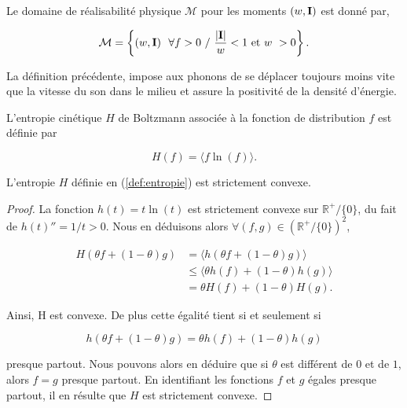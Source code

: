 \begin{definition}

  Le domaine de réalisabilité physique $\mathcal{M}$ pour les moments $(w,\mathbf{I})$ 
  est donné par,

  \begin{equation}
    \mathcal{M} = \left\{ (w,\mathbf{I})\ \ \forall f > 0 \ / \ \frac{\left\lvert \mathbf{I} \right\rvert}{w } 
    < 1 \mbox{ et } w \ > 0 \right\}.
  \end{equation}

\end{definition}

La définition précédente, impose aux phonons de se déplacer toujours moins vite que la vitesse du son dans le milieu et assure la positivité de la densité d'énergie.

\begin{definition}

  L'entropie cinétique $H$ de Boltzmann associée à la fonction de distribution 
  $f$ est définie par

  \begin{equation}
  \label{def:entropie}
    H(f) = \langle f \ln(f) \rangle.
  \end{equation}
 
\end{definition}

\begin{proposition}
L'entropie $H$ définie en (\ref{def:entropie}) est strictement convexe.
\end{proposition}

\begin{proof}
La fonction $h(t) = t\ln(t)$ est strictement convexe sur 
$\mathbb{R}^{+}/ \{0\}$, du fait de $h(t)'' = 1/t > 0$. Nous en déduisons alors
 $\forall (f,g) \in (\mathbb{R}^{+}/ \{0\})^2$, 
  
  \begin{equation}
  \begin{aligned}
  H(\theta f + (1-\theta)g) &= \langle h(\theta f + (1-\theta)g) \rangle\\
  & \leq  \langle \theta h(f) + (1-\theta)h(g) \rangle\\
  & = \theta H(f) + (1-\theta)H(g).
  \end{aligned}
  \end{equation}

Ainsi, H est convexe. De plus cette égalité tient si et seulement si 

$$ h(\theta f + (1-\theta)g) =  \theta h(f) + (1-\theta)h(g)$$

presque partout. Nous pouvons alors en déduire que si $\theta$ est différent de
$0$ et de $1$, alors $f=g$ presque partout. En identifiant les fonctions $f$ 
et $g$ égales presque partout, il en résulte que $H$ est  strictement convexe.

\end{proof}


